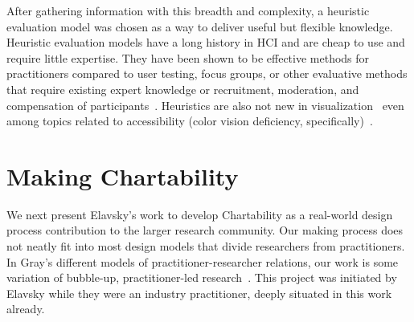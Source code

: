 \documentclass[12pt]{cmuthesis}
\begin{document}
After gathering information with this breadth and complexity, a heuristic evaluation model was chosen as a way to deliver useful but flexible knowledge. Heuristic evaluation models have a long history in HCI and are cheap to use and require little expertise. They have been shown to be effective methods for practitioners compared to user testing, focus groups, or other evaluative methods that require existing expert knowledge or recruitment, moderation, and compensation of participants~\cite{Martinez2021Methodology,Chuan2015Usability,Brangier2018Beyond,Nielsen10,Joyce2016Mobile,Nielsen1994Heuristic,Otey2017methodology,Santos2018Heuristic,Slavkovic1999Novice,Boudreau2018Unlocking}. Heuristics are also not new in visualization~\cite{Forsell2010heuristic,Craft2005Beyond,Oliveira2017Adapting, Scholtz2011Developing} even among topics related to accessibility (color vision deficiency, specifically)~\cite{Santos2018Heuristic, Oliveira2013Towards}.

\section{Making Chartability}
We next present Elavsky’s work to develop Chartability as a real-world design process contribution to the larger research community. Our making process does not neatly fit into most design models that divide researchers from practitioners. In Gray's different models of practitioner-researcher relations, our work is some variation of bubble-up, practitioner-led research~\cite{Gray2014Reprioritizing}. This project was initiated by Elavsky while they were an industry practitioner, deeply situated in this work already.
\end{document}
